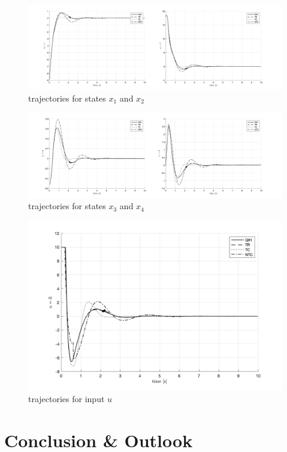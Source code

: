 \documentclass[10pt,a4paper]{article}
\begin{document}
\begin{figure}[h]
	\begin{center}
		\includegraphics[width=\textwidth]{img/bb_time_x1x2.png}
		\caption{trajectories for states $x_1$ and $x_2$}
		\label{pic:bb_time_x1x2}
	\end{center}
\end{figure}

\begin{figure}[h]
	\begin{center}
		\includegraphics[width=\textwidth]{img/bb_time_x3x4.png}
		\caption{trajectories for states $x_3$ and $x_4$}
		\label{pic:bb_time_x3x4}
	\end{center}
\end{figure}

\begin{figure}[h]
	\begin{center}
		\includegraphics[width=\textwidth]{img/bb_time_u.png}
		\caption{trajectories for input $u$}
		\label{pic:bb_time_u}
	\end{center}
\end{figure}




\section{Conclusion \& Outlook}
\label{sec:conclusion}



\pagebreak



\pagebreak
\listoftodos

\end{document}
